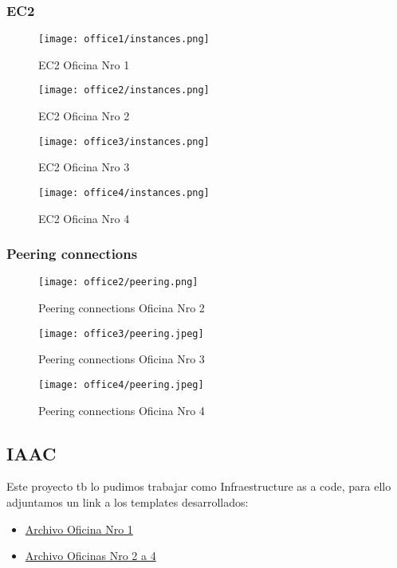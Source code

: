\subsubsection{EC2}
\begin{figure}[H]
    \centering
    \texttt{[image: office1/instances.png]}
    \caption{EC2 Oficina Nro 1}
\end{figure}
\begin{figure}[H]
    \centering
    \texttt{[image: office2/instances.png]}
    \caption{EC2 Oficina Nro 2}
\end{figure}
\begin{figure}[H]
    \centering
    \texttt{[image: office3/instances.png]}
    \caption{EC2 Oficina Nro 3}
\end{figure}
\begin{figure}[H]
    \centering
    \texttt{[image: office4/instances.png]}
    \caption{EC2 Oficina Nro 4}
\end{figure}

\subsubsection{Peering connections}
\begin{figure}[H]
    \centering
    \texttt{[image: office2/peering.png]}
    \caption{Peering connections Oficina Nro 2}
\end{figure}
\begin{figure}[H]
    \centering
    \texttt{[image: office3/peering.jpeg]}
    \caption{Peering connections Oficina Nro 3}
\end{figure}
\begin{figure}[H]
    \centering
    \texttt{[image: office4/peering.jpeg]}
    \caption{Peering connections Oficina Nro 4}
\end{figure}


\subsection{IAAC}
Este proyecto tb lo pudimos trabajar como Infraestructure as a code, para ello
adjuntamos un link a los templates desarrollados:

\begin{itemize}
    \item \href{https://drive.google.com/file/d/1u4f-frY8Qxzu-rSUNlfpc-P0J_J1hXkT/view?usp=drive_link}{Archivo Oficina Nro 1}
    \item \href{https://drive.google.com/file/d/1HNa-tv0MkeSS53UXJ5UDpZrJcfHCE2PN/view?usp=drive_link}{Archivo Oficinas Nro 2 a 4}
\end{itemize}
